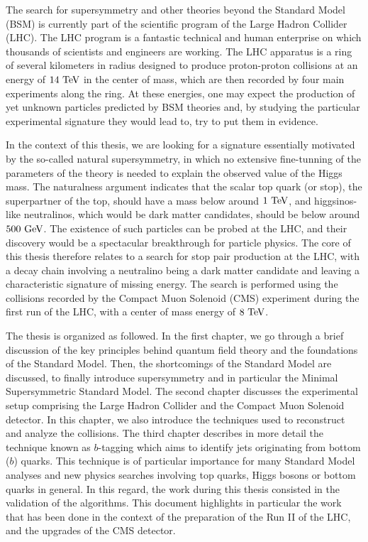 The search for supersymmetry and other theories beyond the Standard Model (BSM) is currently
part of the scientific program of the Large Hadron Collider (LHC). The LHC program is a
fantastic technical and human
enterprise on which thousands of scientists and engineers are working. The LHC apparatus
is a ring of several kilometers in radius designed to produce proton-proton collisions at
an energy of $14~\text{TeV}$ in the center of mass, which are then recorded by four main
experiments along the ring. At these energies, one may expect the production of yet unknown
particles predicted by BSM theories and, by studying the particular experimental signature
they would lead to, try to put them in evidence.

In the context of this thesis, we are looking for a signature essentially motivated by
the so-called natural supersymmetry, in which no extensive fine-tunning of the parameters of
the theory is needed to explain the observed value of the Higgs mass. The naturalness
argument indicates that the scalar top quark (or stop), the superpartner of the top, should have
a mass below around $1~\text{TeV}$, and higgsinos-like neutralinos, which would be dark matter
candidates, should be below around $500~\text{GeV}$. The existence of such particles can be probed
at the LHC, and their discovery would be a spectacular breakthrough for particle physics.
The core of this thesis therefore relates to a search for stop pair production at the LHC,
with a decay chain involving a neutralino being a dark matter candidate and leaving a
characteristic signature of missing energy. The search is performed using the
collisions recorded by the Compact Muon Solenoid (CMS) experiment during the first run of
the LHC, with a center of mass energy of $8~\text{TeV}$.

The thesis is organized as followed. In the first chapter, we go through a brief
discussion of the key principles behind quantum field theory and the foundations of the
Standard Model. Then, the shortcomings of the Standard Model are discussed, to finally
introduce supersymmetry and in particular the Minimal Supersymmetric Standard Model. The
second chapter discusses the experimental setup comprising the Large Hadron Collider and
the Compact Muon Solenoid detector. In this chapter, we also introduce the techniques used
to reconstruct and analyze the collisions. The third chapter describes in more detail the
technique known as $b$-tagging which aims to identify jets originating from bottom ($b$)
quarks. This technique is of particular importance for many Standard Model analyses and new
physics searches involving top quarks, Higgs bosons or bottom quarks in general. In this
regard, the work during this thesis consisted in the validation of the algorithms. This
document highlights in particular the work that has been done in the context of the
preparation of the Run II of the LHC, and the upgrades of the CMS detector.

